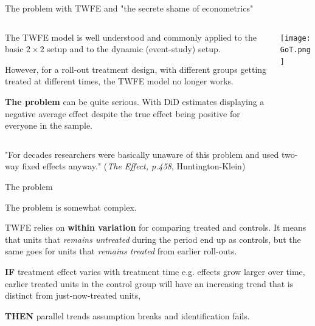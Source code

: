\documentclass[notes,11pt, aspectratio=169]{beamer}
\newenvironment{wideitemize}{\itemize\addtolength{\itemsep}{10pt}}{\enditemize}
\begin{document}
\begin{frame}{The problem with TWFE and "the secrete shame of econometrics"}
\begin{columns}[T] %
    \begin{column}{0.6\textwidth}
      \begin{wideitemize} 
        \item The TWFE model is well understood and commonly applied to the basic $2\times2$ setup and to the dynamic (event-study) setup.
        \item However, for a roll-out treatment design, with different groups getting treated at different times, the TWFE model no longer works.
        \item \textbf{The problem} can be quite serious. With DiD estimates displaying a negative average effect despite the true effect being positive for everyone in the sample. 
            \end{wideitemize}
    \end{column}%
    \hfill%
    \begin{column}{.4\textwidth}
    \begin{center}
 \texttt{[image: GoT.png]}                 
    \end{center}
    \end{column}
  \end{columns}
  \begin{displayquote}
  "For decades researchers were basically unaware of this problem and used two-way fixed effects anyway."
  \flushright\tiny (\emph{The Effect, p.458}, Huntington-Klein)
\end{displayquote}
    \end{frame}

\begin{frame}{The problem}
      \begin{wideitemize}
        \item The problem is somewhat complex. 
        \item TWFE relies on \textbf{within variation} for comparing treated and controls. It means that units that \textit{remains untreated} during the period end up as controls, but the same goes for units that \textit{remains treated} from earlier roll-outs.
        \item \textbf{IF} treatment effect varies with treatment time e.g. effects grow larger over time, earlier treated units in the control group will have an increasing trend that is distinct from just-now-treated units, 
        \item \textbf{THEN} parallel trends assumption breaks and identification fails.  
        \end{wideitemize}
        \end{frame}
\end{document}
